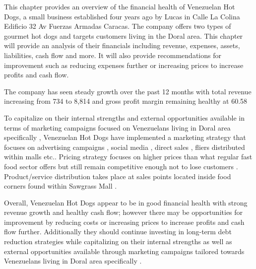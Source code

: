 

This chapter provides an overview of the financial health of Venezuelan Hot Dogs, a small business established four years ago by Lucas in Calle La Colina Edificio 32 Av Fuerzas Armadas Caracas. The company offers two types of gourmet hot dogs and targets customers living in the Doral area. This chapter will provide an analysis of their financials including revenue, expenses, assets, liabilities, cash flow and more. It will also provide recommendations for improvement such as reducing expenses further or increasing prices to increase profits and cash flow. 

The company has seen steady growth over the past 12 months with total revenue increasing from 734 to 8,814 and gross profit margin remaining healthy at 60.58%

To capitalize on their internal strengths and external opportunities available in terms of marketing campaigns focused on Venezuelans living in Doral area specifically , Venezuelan Hot Dogs have implemented a marketing strategy that focuses on advertising campaigns , social media , direct sales , fliers distributed within malls etc.. Pricing strategy focuses on higher prices than what regular fast food sector offers but still remain competitive enough not to lose customers . Product/service distribution takes place at sales points located inside food corners found within Sawgrass Mall . 

Overall, Venezuelan Hot Dogs appear to be in good financial health with strong revenue growth and healthy cash flow; however there may be opportunities for improvement by reducing costs or increasing prices to increase profits and cash flow further. Additionally they should continue investing in long-term debt reduction strategies while capitalizing on their internal strengths as well as external opportunities available through marketing campaigns tailored towards Venezuelans living in Doral area specifically .